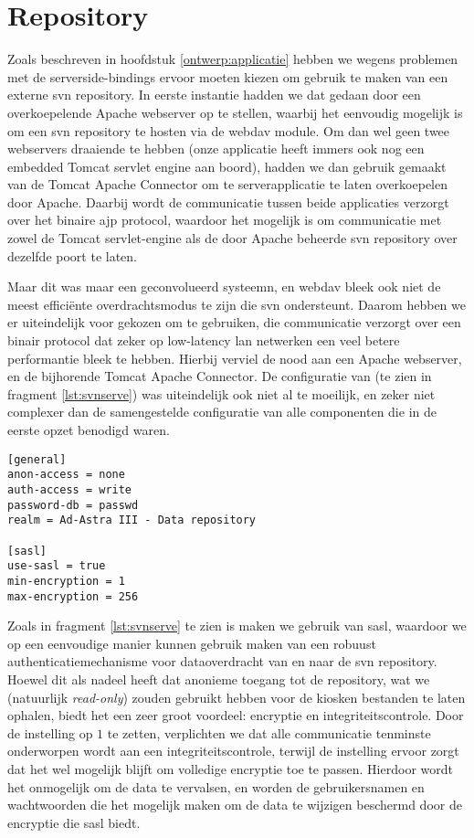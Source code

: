 \section{Repository}
\label{server:deployment:repository}

Zoals beschreven in hoofdstuk \ref{ontwerp:applicatie} hebben we wegens problemen met de serverside-bindings ervoor moeten kiezen om gebruik te maken van een externe \ac{svn} repository. In eerste instantie hadden we dat gedaan door een overkoepelende Apache webserver op te stellen, waarbij het eenvoudig mogelijk is om een \ac{svn} repository te hosten via de  \ac{webdav} module. Om dan wel geen twee webservers draaiende te hebben (onze applicatie heeft immers ook nog een embedded Tomcat servlet engine aan boord), hadden we dan gebruik gemaakt van de  Tomcat Apache Connector om te serverapplicatie te laten overkoepelen door Apache. Daarbij wordt de communicatie tussen beide applicaties verzorgt over het binaire \ac{ajp} protocol, waardoor het mogelijk is om communicatie met zowel de Tomcat servlet-engine als de door Apache beheerde \ac{svn} repository over dezelfde poort te laten.

Maar dit was maar een geconvolueerd systeemn, en \ac{webdav} bleek ook niet de meest efficiënte overdrachtsmodus te zijn die \ac{svn} ondersteunt. Daarom hebben we er uiteindelijk voor gekozen om  te gebruiken, die communicatie verzorgt over een binair protocol dat zeker op low-latency \ac{lan} netwerken een veel betere performantie bleek te hebben. Hierbij verviel de nood aan een Apache webserver, en de bijhorende Tomcat Apache Connector. De configuratie van  (te zien in fragment \ref{lst:svnserve}) was uiteindelijk ook niet al te moeilijk, en zeker niet complexer dan de samengestelde configuratie van alle componenten die in de eerste opzet benodigd waren.

\begin{lstlisting}[float, caption=Configuratie van een door svnserve-beheerde \acs{svn} repository., label=lst:svnserve]
[general]
anon-access = none
auth-access = write
password-db = passwd
realm = Ad-Astra III - Data repository

[sasl]
use-sasl = true
min-encryption = 1
max-encryption = 256
\end{lstlisting}

Zoals in fragment \ref{lst:svnserve} te zien is maken we gebruik van \ac{sasl}, waardoor we op een eenvoudige manier kunnen gebruik maken van een robuust authenticatiemechanisme voor dataoverdracht van en naar de \ac{svn} repository. Hoewel dit als nadeel heeft dat anonieme toegang tot de repository, wat we (natuurlijk \emph{read-only}) zouden gebruikt hebben voor de kiosken bestanden te laten ophalen, biedt het een zeer groot voordeel: encryptie en integriteitscontrole. Door de  instelling op $1$ te zetten, verplichten we dat alle communicatie tenminste onderworpen wordt aan een integriteitscontrole, terwijl de  instelling ervoor zorgt dat het wel mogelijk blijft om volledige encryptie toe te passen. Hierdoor wordt het onmogelijk om de data te vervalsen, en worden de gebruikersnamen en wachtwoorden die het mogelijk maken om de data te wijzigen beschermd door de encryptie die \ac{sasl} biedt.
